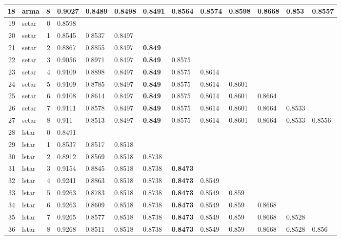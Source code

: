 \documentclass[10pt,a4paper]{article}
\begin{document}
\begin{table}[ht]
\begin{tabular}{rlrllllllllll}
  18 & arma &     8 & 0.9027 & \textbf{0.8489} & 0.8498 & 0.8491 & 0.8564 & 0.8574 & 0.8598 & 0.8668 & 0.853 & 0.8557 \\ 
   \hline
19 & setar &     0 & 0.8598 &  &  &  &  &  &  &  &  &  \\ 
  20 & setar &     1 & 0.8545 & 0.8537 & 0.8497 &  &  &  &  &  &  &  \\ 
  21 & setar &     2 & 0.8867 & 0.8855 & 0.8497 & \textbf{0.849} &  &  &  &  &  &  \\ 
  22 & setar &     3 & 0.9056 & 0.8971 & 0.8497 & \textbf{0.849} & 0.8575 &  &  &  &  &  \\ 
  23 & setar &     4 & 0.9109 & 0.8898 & 0.8497 & \textbf{0.849} & 0.8575 & 0.8614 &  &  &  &  \\ 
  24 & setar &     5 & 0.9109 & 0.8785 & 0.8497 & \textbf{0.849} & 0.8575 & 0.8614 & 0.8601 &  &  &  \\ 
  25 & setar &     6 & 0.9108 & 0.8614 & 0.8497 & \textbf{0.849} & 0.8575 & 0.8614 & 0.8601 & 0.8664 &  &  \\ 
  26 & setar &     7 & 0.9111 & 0.8578 & 0.8497 & \textbf{0.849} & 0.8575 & 0.8614 & 0.8601 & 0.8664 & 0.8533 &  \\ 
  27 & setar &     8 & 0.911 & 0.8513 & 0.8497 & \textbf{0.849} & 0.8575 & 0.8614 & 0.8601 & 0.8664 & 0.8533 & 0.8556 \\ 
   \hline
28 & lstar &     0 & 0.8491 &  &  &  &  &  &  &  &  &  \\ 
  29 & lstar &     1 & 0.8537 & 0.8517 & 0.8518 &  &  &  &  &  &  &  \\ 
  30 & lstar &     2 & 0.8912 & 0.8569 & 0.8518 & 0.8738 &  &  &  &  &  &  \\ 
  31 & lstar &     3 & 0.9154 & 0.8845 & 0.8518 & 0.8738 & \textbf{0.8473} &  &  &  &  &  \\ 
  32 & lstar &     4 & 0.9241 & 0.8863 & 0.8518 & 0.8738 & \textbf{0.8473} & 0.8549 &  &  &  &  \\ 
  33 & lstar &     5 & 0.9263 & 0.8783 & 0.8518 & 0.8738 & \textbf{0.8473} & 0.8549 & 0.859 &  &  &  \\ 
  34 & lstar &     6 & 0.9263 & 0.8609 & 0.8518 & 0.8738 & \textbf{0.8473} & 0.8549 & 0.859 & 0.8668 &  &  \\ 
  35 & lstar &     7 & 0.9265 & 0.8577 & 0.8518 & 0.8738 & \textbf{0.8473} & 0.8549 & 0.859 & 0.8668 & 0.8528 &  \\ 
  36 & lstar &     8 & 0.9268 & 0.8511 & 0.8518 & 0.8738 & \textbf{0.8473} & 0.8549 & 0.859 & 0.8668 & 0.8528 & 0.856 \\ 

\end{tabular}
\end{table}
\end{document}
